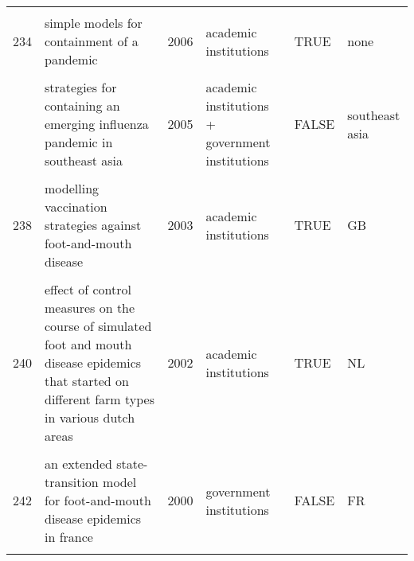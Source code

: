 \documentclass[
]{article}
\begin{document}
\begin{landscape}
\begin{longtable}{l>{\raggedright\arraybackslash}p{4cm}l>{\raggedright\arraybackslash}p{3.5cm}l>{\raggedright\arraybackslash}p{1.5cm}}
\cellcolor{gray!6}{233} & \cellcolor{gray!6}{mitigation strategies for pandemic influenza in the united states} & \cellcolor{gray!6}{2006} & \cellcolor{gray!6}{academic institutions + government institutions} & \cellcolor{gray!6}{FALSE} & \cellcolor{gray!6}{US}\\
234 & simple models for containment of a pandemic & 2006 & academic institutions & TRUE & none\\
\cellcolor{gray!6}{235} & \cellcolor{gray!6}{statistical inference in a stochastic epidemic seir model with control intervention: ebola as a case study} & \cellcolor{gray!6}{2006} & \cellcolor{gray!6}{academic institutions} & \cellcolor{gray!6}{TRUE} & \cellcolor{gray!6}{CD}\\
\addlinespace
236 & strategies for containing an emerging influenza pandemic in southeast asia & 2005 & academic institutions + government institutions & FALSE & southeast asia\\
\cellcolor{gray!6}{237} & \cellcolor{gray!6}{modeling alternative mitigation strategies for a hypothetical outbreak of foot-and-mouth disease in the united states} & \cellcolor{gray!6}{2003} & \cellcolor{gray!6}{government institutions} & \cellcolor{gray!6}{FALSE} & \cellcolor{gray!6}{US}\\
238 & modelling vaccination strategies against foot-and-mouth disease & 2003 & academic institutions & TRUE & GB\\
\cellcolor{gray!6}{239} & \cellcolor{gray!6}{a decision-tree to optimise control measures during the early stage of a foot-and-mouth disease epidemic} & \cellcolor{gray!6}{2002} & \cellcolor{gray!6}{academic institutions + government institutions} & \cellcolor{gray!6}{FALSE} & \cellcolor{gray!6}{NL}\\
240 & effect of control measures on the course of simulated foot and mouth disease epidemics that started on different farm types in various dutch areas & 2002 & academic institutions & TRUE & NL\\
\addlinespace
\cellcolor{gray!6}{241} & \cellcolor{gray!6}{dynamics of the 2001 uk foot and mouth epidemic: stochastic dispersal in a heterogeneous landscape} & \cellcolor{gray!6}{2001} & \cellcolor{gray!6}{academic institutions + government institutions} & \cellcolor{gray!6}{FALSE} & \cellcolor{gray!6}{GB}\\
242 & an extended state-transition model for foot-and-mouth disease epidemics in france & 2000 & government institutions & FALSE & FR\\
\cellcolor{gray!6}{243} & \cellcolor{gray!6}{simulated economic consequences of foot-and-mouth disease epidemics and their public control in france} & \cellcolor{gray!6}{2000} & \cellcolor{gray!6}{government institutions} & \cellcolor{gray!6}{FALSE} & \cellcolor{gray!6}{FR}\\

\end{longtable}
\end{landscape}
\end{document}
